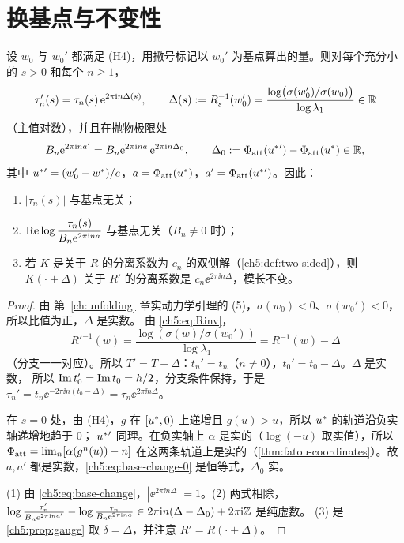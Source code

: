 \section{换基点与不变性}\label{ch5:sec:invariance}

\begin{proposition}[换基点]\label{prop:base-point}
设 $w_0$ 与 $w_0'$ 都满足 (H4)，用撇号标记以 $w_0'$ 为基点算出的量。则对每个充分小的 $s>0$ 和每个 $n\ge1$，
\begin{equation}\label{ch5:eq:base-change}
 \tau_n'(s)=\tau_n(s)\,\mathrm{e}^{2\pi\mathrm{i} n\Delta(s)},\qquad \Delta(s):=R_s^{-1}(w_0')=\frac{\log\bigl(\sigma(w_0')/\sigma(w_0)\bigr)}{\log\lambda_1}\in\mathbb{R}
\end{equation}
（主值对数），并且在抛物极限处
\begin{equation}\label{ch5:eq:base-change-0}
 B_n\mathrm{e}^{2\pi\mathrm{i} na'}=B_n\mathrm{e}^{2\pi\mathrm{i} na}\,\mathrm{e}^{2\pi\mathrm{i} n\Delta_0},\qquad
 \Delta_0:=\Phi_{\mathrm{att}}(u^{*}{}')-\Phi_{\mathrm{att}}(u^{*})\in\mathbb{R} ,
\end{equation}
其中 $u^{*}{}'=(w_0'-w^*)/c$，$a=\Phi_{\mathrm{att}}(u^{*})$，$a'=\Phi_{\mathrm{att}}(u^{*}{}')$。因此：
\begin{enumerate}
\item $|\tau_n(s)|$ 与基点无关；
\item $\operatorname{Re}\log\dfrac{\tau_n(s)}{B_n\mathrm{e}^{2\pi\mathrm{i} na}}$ 与基点无关（$B_n\ne0$ 时）；
\item 若 $K$ 是关于 $R$ 的分离系数为 $c_n$ 的双侧解（\cref{ch5:def:two-sided}），则 $K(\cdot+\Delta)$ 关于 $R'$ 的分离系数是
  $c_n\ee^{2\pi\ii n\Delta}$，模长不变。
\end{enumerate}
\end{proposition}

\begin{proof}
由 第~\ref{ch:unfolding} 章实动力学引理的 (5)，$\sigma(w_0)<0$、$\sigma(w_0')<0$，所以比值为正，$\Delta$ 是实数。
由 \eqref{ch5:eq:Rinv}，
\[
 R'^{-1}(w)=\frac{\log(\sigma(w)/\sigma(w_0'))}{\log\lambda_1}=R^{-1}(w)-\Delta
\]
（分支一一对应）。所以 $T'=T-\Delta$：$t_n'=t_n$（$n\ne0$），$t_0'=t_0-\Delta$。$\Delta$ 是实数，
所以 $\operatorname{Im} t_0'=\operatorname{Im} t_0=h/2$，分支条件保持，于是 $\tau_n'=t_n\ee^{-2\pi\ii n(t_0-\Delta)}=\tau_n\ee^{2\pi\ii n\Delta}$。

在 $s=0$ 处，由 (H4)，$g$ 在 $[u^{*},0)$ 上递增且 $g(u)>u$，所以 $u^{*}$ 的轨道沿负实轴递增地趋于 $0$；
$u^{*}{}'$ 同理。在负实轴上 $\alpha$ 是实的（$\log(-u)$ 取实值），所以 $\Phi_{\mathrm{att}}=\lim_n[\alpha(g^n(u))-n]$
在这两条轨道上是实的（\cref{thm:fatou-coordinates}）。故 $a,a'$ 都是实数，\eqref{ch5:eq:base-change-0} 是恒等式，$\Delta_0$ 实。

(1) 由 \eqref{ch5:eq:base-change}，$|\ee^{2\pi\ii n\Delta}|=1$。(2) 两式相除，
$\log\frac{\tau_n'}{B_n\mathrm{e}^{2\pi\mathrm{i} na'}}-\log\frac{\tau_n}{B_n\mathrm{e}^{2\pi\mathrm{i} na}}\in2\pi\mathrm{i} n(\Delta-\Delta_0)+2\pi\mathrm{i}\mathbb{Z}$ 是纯虚数。
(3) 是 \cref{ch5:prop:gauge} 取 $\delta=\Delta$，并注意 $R'=R(\cdot+\Delta)$。
\end{proof}

